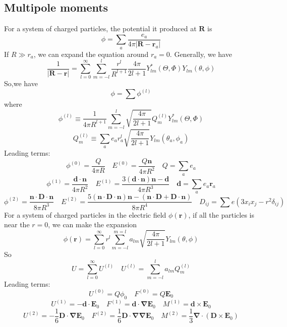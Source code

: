 \subsection{Multipole moments}
For a system of charged particles, the potential it produced at $\bm{R}$ is
\[\phi = \sum_a \frac{e_a}{4\pi|\bm{R} - \bm{r}_a|}\]
If $R \gg r_a$, we can expand the equation around $r_a=0$. Generally, we have
\[\frac{1}{|\bm{R} - \bm{r}|} = \sum_{l=0}^{\infty} \sum_{m=-l}^{l} \frac{r^l}{R^{l+1}} \frac{4\pi}{2l+1} Y^*_{lm}(\Theta,\Phi)Y_{lm}(\theta,\phi)\]
So,we have
\[\phi = \sum \phi^{(l)}\]
where
\[\phi^{(l)} \equiv \frac{1}{4\pi R^{l+1}} \sum_{m=-l}^{l} \sqrt{\frac{4\pi}{2l+1}} Q_{m}^{(l)} Y^*_{lm}(\Theta,\Phi)\]
\[Q_m^{(l)} \equiv \sum_a e_a r_a^l \sqrt{\frac{4\pi}{2l+1}} Y_{lm}(\theta_a,\phi_a)\]
Leading terms: 
\[\phi^{(0)} = \frac{Q}{4\pi R} \quad E^{(0)} = \frac{Q\bm{n}}{4\pi R^2} \quad Q = \sum_a e_a\]
\[\phi^{(1)} = \frac{\bm{d} \cdot \bm{n}}{4\pi R^2}  \quad E^{(1)} = \frac{3(\bm{d}\cdot\bm{n})\bm{n}-\bm{d}}{4\pi R^3} \quad \bm{d} = \sum_a e_a \bm{r}_a\]
\[\phi^{(2)} = \frac{\bm{n} \cdot \bm{D} \cdot \bm{n}}{8\pi R^3} \quad E^{(2)} = \frac{5(\bm{n} \cdot \bm{D} \cdot \bm{n})\bm{n} - (\bm{n} \cdot \bm{D} + \bm{D} \cdot \bm{n})}{8\pi R^4} \quad D_{ij} = \sum e(3x_ix_j-r^2\delta_{ij})\]
For a system of charged particles in the electric field $\phi(\bm{r})$, if all the particles is near the $r=0$, we can make the expansion
\[\phi(\bm{r}) = \sum_{l=0}^{\infty} r^l \sum_{m=-l}^{m=l} a_{lm} \sqrt{\frac{4\pi}{2l+1}} Y_{lm}(\theta,\phi)\]
So
\[U = \sum_{l=0}^{\infty} U^{(l)} \quad U^{(l)} = \sum_{m=-l}^{l} a_{lm}Q^{(l)}_m\]
Leading terms: 
\[U^{(0)} = Q\phi_0 \quad F^{(0)} = Q\bm{E}_0\]
\[U^{(1)} = -\bm{d}\cdot \bm{E}_0 \quad F^{(1)} = \bm{d}\cdot \bm{\nabla}\bm{E}_0 \quad M^{(1)} = \bm{d} \times \bm{E}_0\]
\[U^{(2)} = -\frac{1}{6}\bm{D}\cdot \bm{\nabla}\bm{E}_0 \quad F^{(2)} = \frac{1}{6} \bm{D}\cdot \bm{\nabla}\bm{\nabla}\bm{E}_0 \quad M^{(2)} = \frac{1}{3} \bm{\nabla} \cdot (\bm{D} \times \bm{E}_0)\]

